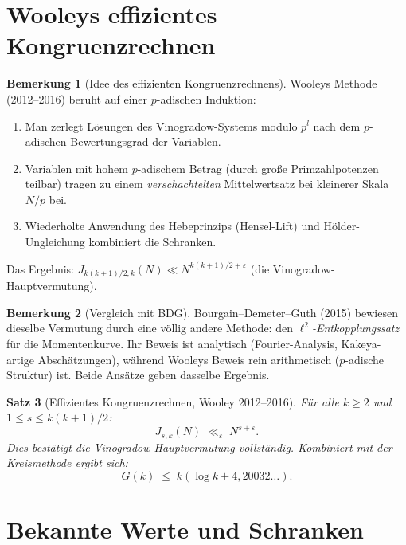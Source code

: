 \documentclass[12pt,a4paper]{amsart}
\newtheorem{theorem}{Satz}[section]
\theoremstyle{definition}
\newtheorem{bemerkung}[theorem]{Bemerkung}
\begin{document}
\section{Wooleys effizientes Kongruenzrechnen}
\label{sec:effizient}

\begin{bemerkung}[Idee des effizienten Kongruenzrechnens]
  Wooleys Methode (2012--2016) beruht auf einer $p$-adischen Induktion:
  \begin{enumerate}
    \item Man zerlegt Lösungen des Vinogradow-Systems modulo $p^l$ nach
      dem $p$-adischen Bewertungsgrad der Variablen.
    \item Variablen mit hohem $p$-adischem Betrag (durch große
      Primzahlpotenzen teilbar) tragen zu einem \emph{verschachtelten}
      Mittelwertsatz bei kleinerer Skala $N/p$ bei.
    \item Wiederholte Anwendung des Hebeprinzips (Hensel-Lift) und
      H\"older-Ungleichung kombiniert die Schranken.
  \end{enumerate}
  Das Ergebnis: $J_{k(k+1)/2, k}(N) \ll N^{k(k+1)/2 + \varepsilon}$
  (die Vinogradow-Hauptvermutung).
\end{bemerkung}

\begin{bemerkung}[Vergleich mit BDG]
  Bourgain--Demeter--Guth (2015) bewiesen dieselbe Vermutung durch eine
  völlig andere Methode: den \emph{$\ell^2$-Entkopplungssatz} für die
  Momentenkurve.  Ihr Beweis ist analytisch (Fourier-Analysis,
  Kakeya-artige Abschätzungen), während Wooleys Beweis rein arithmetisch
  ($p$-adische Struktur) ist.  Beide Ansätze geben dasselbe Ergebnis.
\end{bemerkung}

\begin{theorem}[Effizientes Kongruenzrechnen, Wooley 2012--2016]%
  \label{thm:effcong}
  Für alle $k \geq 2$ und $1 \leq s \leq k(k+1)/2$:
  \[
    J_{s,k}(N) \;\ll_\varepsilon\; N^{s+\varepsilon}.
  \]
  Dies bestätigt die Vinogradow-Hauptvermutung vollständig.
  Kombiniert mit der Kreismethode ergibt sich:
  \[
    G(k) \;\leq\; k\!\left(\log k + 4{,}20032\ldots\right).
  \]
\end{theorem}

\section{Bekannte Werte und Schranken}
\label{sec:werte}
\end{document}
